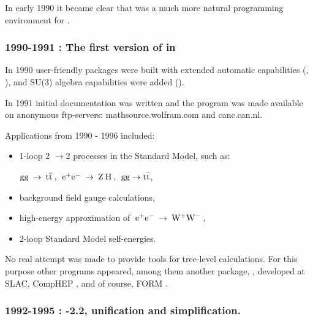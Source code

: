 In early 1990 it became clear that \mma was a much more natural programming environment for \fc.

\subsubsection*{1990-1991 : The first version  of \fc in \mma}

In 1990 user-friendly  packages were built with extended automatic capabilities (,
), and SU(3) algebra capabilities were added ().

In 1991 initial documentation was written and the program was made available on anonymous
ftp-servers: mathsource.wolfram.com and canc.can.nl.

Applications from 1990 - 1996  included:

\begin{itemize}

\item 1-loop 2 \(\rightarrow \)2 processes in the Standard
Model, such as:

\({\rm gg}\> \rightarrow \>
{\rm t \overline{t}} \> , \> \>
{{\rm e}^+}{{\rm e}^-}\> \rightarrow \> {\rm Z}\> {\rm H}\>, \> \>
{\rm gg} \rightarrow {\rm t\bar{t}} \),

\item background field gauge calculations,

\item high-energy approximation of \(\>{{\rm e}^+}
{{\rm e}^-}\> \rightarrow \> {{\rm W}^+}{{\rm W}^-}\> \),

\item  2-loop Standard Model self-energies.

\end{itemize}

No real attempt was made to provide tools for tree-level calculations.
For this purpose other programs appeared, among them another  \mma package, \hip \cite{yeh}, developed at SLAC,
CompHEP \cite{Pukhov:1999gg}, and of course, FORM \cite{Vermaseren:2000nd}.

\subsubsection*{1992-1995 : -2.2, unification and simplification.}

